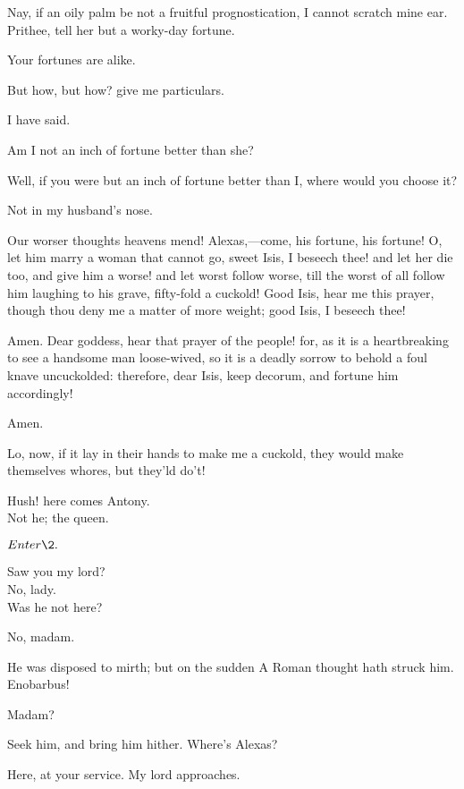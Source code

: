\documentclass{book}
\begin{document}
\begin{PROSE}
\7	Nay, if an oily palm be not a fruitful
	prognostication, I cannot scratch mine ear. Prithee,
	tell her but a worky-day fortune.

	Your fortunes are alike.

	But how, but how? give me particulars.

	I have said.

	Am I not an inch of fortune better than she?

\7	Well, if you were but an inch of fortune better than
	I, where would you choose it?

	Not in my husband's nose.

\7	Our worser thoughts heavens mend! Alexas,---come,
	his fortune, his fortune! O, let him marry a woman
	that cannot go, sweet Isis, I beseech thee! and let
	her die too, and give him a worse! and let worst
	follow worse, till the worst of all follow him
	laughing to his grave, fifty-fold a cuckold! Good
	Isis, hear me this prayer, though thou deny me a
	matter of more weight; good Isis, I beseech thee!

	Amen. Dear goddess, hear that prayer of the people!
	for, as it is a heartbreaking to see a handsome man
	loose-wived, so it is a deadly sorrow to behold a
	foul knave uncuckolded: therefore, dear Isis, keep
	decorum, and fortune him accordingly!

\7	Amen.

\5	Lo, now, if it lay in their hands to make me a
	cuckold, they would make themselves whores, but
	they'ld do't!

\end{PROSE}

	Hush! here comes Antony. \\

\7	Not he; the queen.

	\(Enter \2.\)

\2	Saw you my lord? \\

	                  No, lady. \\

\2	Was he not here? 

\7	No, madam.

\2	He was disposed to mirth; but on the sudden
	A Roman thought hath struck him. Enobarbus!

	Madam?

\2	Seek him, and bring him hither. 	Where's Alexas?

\5	Here, at your service. My lord approaches.
\end{document}

